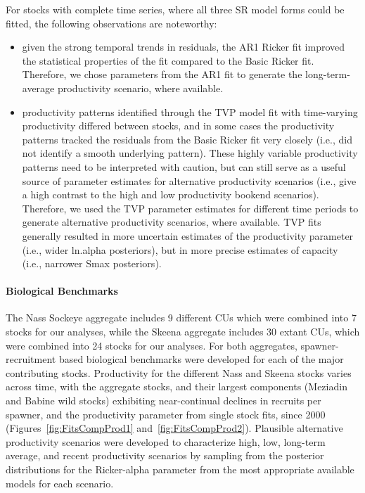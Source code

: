 \documentclass[french,11pt]{book}
\begin{document}
For stocks with complete time series, where all three SR model forms could be fitted, the following observations are noteworthy:
\begin{itemize}

\item
  given the strong temporal trends in residuals, the AR1 Ricker fit improved the statistical properties of the fit compared to the Basic Ricker fit. Therefore, we chose parameters from the AR1 fit to generate the long-term-average productivity scenario, where available.
\item
  productivity patterns identified through the TVP model fit with time-varying productivity differed between stocks, and in some cases the productivity patterns tracked the residuals from the Basic Ricker fit very closely (i.e., did not identify a smooth underlying pattern). These highly variable productivity patterns need to be interpreted with caution, but can still serve as a useful source of parameter estimates for alternative productivity scenarios (i.e., give a high contrast to the high and low productivity bookend scenarios). Therefore, we used the TVP parameter estimates for different time periods to generate alternative productivity scenarios, where available. TVP fits generally resulted in more uncertain estimates of the productivity parameter (i.e., wider ln.alpha posteriors), but in more precise estimates of capacity (i.e., narrower Smax posteriors).
\end{itemize}
\paragraph{Biological Benchmarks}\label{biological-benchmarks}

The Nass Sockeye aggregate includes 9 different CUs which were combined into 7 stocks for our analyses, while the Skeena aggregate includes 30 extant CUs, which were combined into 24 stocks for our analyses. For both aggregates, spawner-recruitment based biological benchmarks were developed for each of the major contributing stocks. Productivity for the different Nass and Skeena stocks varies across time, with the aggregate stocks, and their largest components (Meziadin and Babine wild stocks) exhibiting near-continual declines in recruits per spawner, and the productivity parameter from single stock fits, since 2000 (Figures~\ref{fig:FitsCompProd1} and~\ref{fig:FitsCompProd2}). Plausible alternative productivity scenarios were developed to characterize high, low, long-term average, and recent productivity scenarios by sampling from the posterior distributions for the Ricker-alpha parameter from the most appropriate available models for each scenario.
\end{document}
